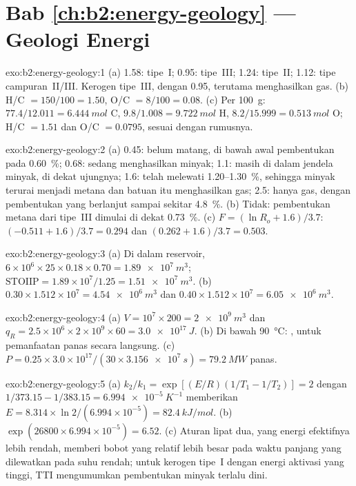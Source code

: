 \section*{Bab \ref{ch:b2:energy-geology} --- Geologi Energi}

\begin{solution}{exo:b2:energy-geology:1}
(a) 1.58: tipe~I; 0.95: tipe~III; 1.24: tipe~II; 1.12: tipe campuran~II/III. Kerogen tipe~III, dengan
0.95, terutama menghasilkan gas. (b) H/C $= 150/100 = 1.50$, O/C $= 8/100 = 0.08$. (c) Per \qty{100}{g}:
$77.4/12.011 = \qty{6.444}{mol}$ C, $9.8/1.008 = \qty{9.722}{mol}$ H, $8.2/15.999 =
\qty{0.513}{mol}$ O; H/C $= 1.51$ dan O/C $= 0.0795$, sesuai dengan rumusnya.
\end{solution}

\begin{solution}{exo:b2:energy-geology:2}
(a) 0.45: belum matang, di bawah awal pembentukan pada \qty{0.60}{\percent}; 0.68: sedang menghasilkan minyak; 1.1: masih di dalam
jendela minyak, di dekat ujungnya; 1.6: telah melewati 1.20--\qty{1.30}{\percent}, sehingga minyak terurai menjadi metana dan
batuan itu menghasilkan gas; 2.5: hanya gas, dengan pembentukan yang berlanjut sampai sekitar \qty{4.8}{\percent}. (b) Tidak: pembentukan
metana dari tipe~III dimulai di dekat \qty{0.73}{\percent}. (c) $F = (\ln R_o + 1.6)/3.7$: $(-0.511 +
1.6)/3.7 = 0.294$ dan $(0.262 + 1.6)/3.7 = 0.503$.
\end{solution}

\begin{solution}{exo:b2:energy-geology:3}
(a) Di dalam reservoir, $6 \times 10^6 \times 25 \times 0.18 \times 0.70 = \qty{1.89e7}{m^3}$;
$\mathrm{STOIIP} = 1.89 \times 10^7/1.25 = \qty{1.51e7}{m^3}$. (b) $0.30 \times 1.512 \times 10^7 =
\qty{4.54e6}{m^3}$ dan $0.40 \times 1.512 \times 10^7 = \qty{6.05e6}{m^3}$.
\end{solution}

\begin{solution}{exo:b2:energy-geology:4}
(a) $V = 10^7 \times 200 = \qty{2e9}{m^3}$ dan $q_R = 2.5 \times 10^6 \times 2 \times 10^9 \times 60
= \qty{3.0e17}{J}$. (b) Di bawah \qty{90}{\celsius}: , untuk pemanfaatan panas
secara langsung. (c) $P = 0.25 \times 3.0 \times 10^{17}/(30 \times \qty{3.156e7}{s}) = \qty{79.2}{MW}$ panas.
\end{solution}

\begin{solution}{exo:b2:energy-geology:5}
(a) $k_2/k_1 = \exp[(E/R)(1/T_1 - 1/T_2)] = 2$ dengan $1/373.15 - 1/383.15 = \qty{6.994e-5}{K^{-1}}$
memberikan $E = 8.314 \times \ln 2/(6.994 \times 10^{-5}) = \qty{82.4}{kJ/mol}$. (b) $\exp(26800 \times
6.994 \times 10^{-5}) = 6.52$. (c) Aturan lipat dua, yang energi efektifnya lebih rendah, memberi
bobot yang relatif lebih besar pada waktu panjang yang dilewatkan pada suhu rendah; untuk kerogen tipe~I dengan energi
aktivasi yang tinggi, TTI mengumumkan pembentukan minyak terlalu dini.
\end{solution}

